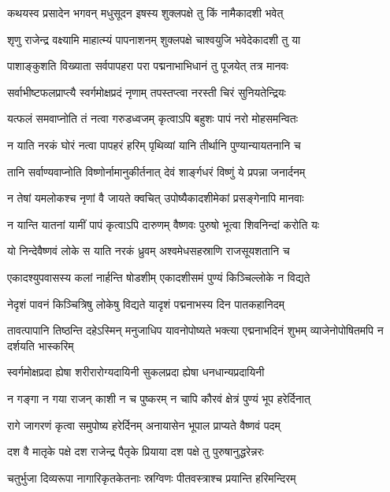 \twolineshloka
{कथयस्व प्रसादेन भगवन् मधुसूदन}
{इषस्य शुक्लपक्षे तु किं नामैकादशी भवेत्} %


\twolineshloka
{शृणु राजेन्द्र वक्ष्यामि माहात्म्यं पापनाशनम्}
{शुक्लपक्षे चाश्वयुजि भवेदेकादशी तु या} %

\twolineshloka
{पाशाङ्कुशति विख्याता सर्वपापहरा परा}
{पद्मनाभाभिधानं तु पूजयेत् तत्र मानवः} %

\twolineshloka
{सर्वाभीष्टफलप्राप्त्यै स्वर्गमोक्षप्रदं नृणाम्}
{तपस्तप्त्वा नरस्ती चिरं सुनियतेन्द्रियः} %

\twolineshloka
{यत्फलं समवाप्नोति तं नत्वा गरुडध्वजम्}
{कृत्वाऽपि बहुशः पापं नरो मोहसमन्वितः} %

\twolineshloka
{न याति नरकं घोरं नत्वा पापहरं हरिम्}
{पृथिव्यां यानि तीर्थानि पुण्यान्यायतनानि च} %

\twolineshloka
{तानि सर्वाण्यवाप्नोति विष्णोर्नामानुकीर्तनात्}
{देवं शार्ङ्गधरं विष्णुं ये प्रपन्ना जनार्दनम्} %

\twolineshloka
{न तेषां यमलोकश्च नृणां वै जायते क्वचित्}
{उपोष्यैकादशीमेकां प्रसङ्गेनापि मानवाः} %

\twolineshloka
{न यान्ति यातनां यामीं पापं कृत्वाऽपि दारुणम्}
{वैष्णवः पुरुषो भूत्वा शिवनिन्दां करोति यः} %

\twolineshloka
{यो निन्देवैष्णवं लोके स याति नरकं ध्रुवम्}
{अश्वमेधसहस्राणि राजसूयशतानि च} %

\twolineshloka
{एकादश्युपवासस्य कलां नार्हन्ति षोडशीम्}
{एकादशीसमं पुण्यं किञ्चिल्लोके न विद्यते} %

\twolineshloka
{नेदृशं पावनं किञ्चित्रिषु लोकेषु विद्यते}
{यादृशं पद्मनाभस्य दिन पातकहानिदम्} %


\threelineshloka
{तावत्पापानि तिष्ठन्ति दहेऽस्मिन् मनुजाधिप}
{यावनोपोष्यते भक्त्या एद्मनाभदिनं शुभम्}
{व्याजेनोपोषितमपि न दर्शयति भास्करिम्} %

\twolineshloka
{स्वर्गमोक्षप्रदा ह्येषा शरीरारोग्यदायिनी}
{सुकलप्रदा ह्येषा धनधान्यप्रदायिनी} %

\twolineshloka
{न गङ्गा न गया राजन् काशी न च पुष्करम्}
{न चापि कौरवं क्षेत्रं पुण्यं भूप हरेर्दिनात्} %

\twolineshloka
{रागे जागरणं कृत्वा समुपोष्य हरेर्दिनम्}
{अनायासेन भूपाल प्राप्यते वैष्णवं पदम्} %

\twolineshloka
{दश वै मातृके पक्षे दश राजेन्द्र पैतृके}
{प्रियाया दश पक्षे तु पुरुषानुद्धरेन्नरः} %

\twolineshloka
{चतुर्भुजा दिव्यरूपा नागारिकृतकेतनाः}
{स्रग्विणः पीतवस्त्राश्च प्रयान्ति हरिमन्दिरम्} %

